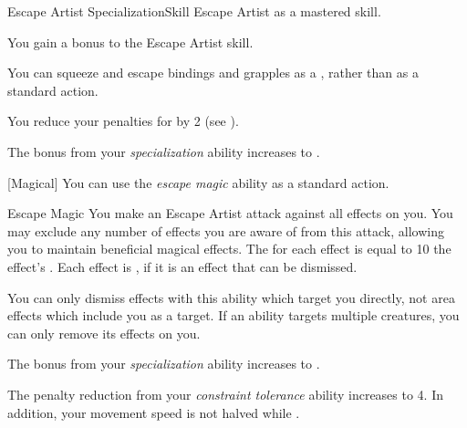     \begin{feat}{Escape Artist Specialization}{Skill}
        \featpre Escape Artist as a mastered skill.

         You gain a  bonus to the Escape Artist skill.

         You can squeeze and escape bindings and grapples as a , rather than as a standard action.

         You reduce your penalties for  by 2 (see ).

         The bonus from your \textit{specialization} ability increases to .

        [Magical] You can use the \textit{escape magic} ability as a standard action.
        \begin{freeability}{Escape Magic}
            You make an Escape Artist attack against all  effects on you.
            You may exclude any number of effects you are aware of from this attack, allowing you to maintain beneficial magical effects.
            The  for each effect is equal to 10 \add the effect's .
            \hit Each effect is , if it is an effect that can be dismissed.
        \end{freeability}

        You can only dismiss effects with this ability which target you directly, not area effects which include you as a target.
        If an ability targets multiple creatures, you can only remove its effects on you.

         The bonus from your \textit{specialization} ability increases to .

         The penalty reduction from your \textit{constraint tolerance} ability increases to 4.
        In addition, your movement speed is not halved while .
    \end{feat}

